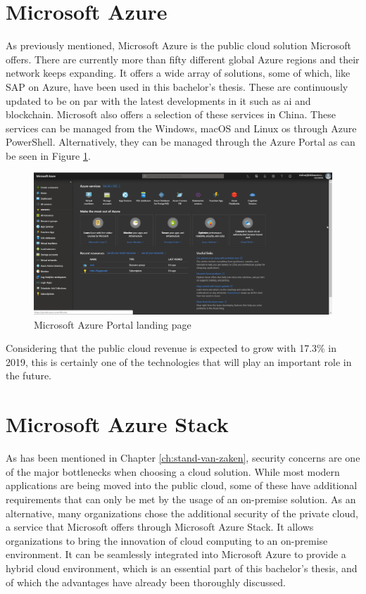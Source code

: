 \section{Microsoft Azure}
As previously mentioned, Microsoft Azure is the public cloud solution Microsoft offers. 
There are currently more than fifty different global Azure regions and their network keeps expanding. 
It offers a wide array of solutions, some of which, like SAP on Azure, have been used in this bachelor's thesis. 
These are continuously updated to be on par with the latest developments in \acrshort{it} such as \acrfull{ai} and blockchain. 
Microsoft also offers a selection of these services in China. 
These services can be managed from the Windows, macOS  and Linux \acrshort{os} through Azure PowerShell. 
Alternatively, they can be managed through the Azure Portal as can be seen in Figure \ref{fig:Azure_Portal}.

\begin{figure}[h]
	\captionsetup{width=0.8\linewidth}
	\includegraphics[width=0.9\linewidth]{img/Toekomstvisie/Azure0.png}
	\centering
	\caption[Azure Portal]{Microsoft Azure Portal landing page}
	\label{fig:Azure_Portal}
\end{figure}
Considering that the public cloud revenue is expected to grow with 17.3\% in 2019, this is certainly one of the technologies that will play an important role in the future. \autocite{Ng2018}

\section{Microsoft Azure Stack}
As has been mentioned in Chapter \ref{ch:stand-van-zaken}, security concerns are one of the major bottlenecks when choosing a cloud solution. 
While most modern applications are being moved into the public cloud, some of these have additional requirements that can only be met by the usage of an on-premise solution. 
As an alternative, many organizations chose the additional security of the private cloud, a service that Microsoft offers through Microsoft Azure Stack. 
It allows organizations to bring the innovation of cloud computing to an on-premise environment.
It can be seamlessly integrated into Microsoft Azure to provide a hybrid cloud environment, which is an essential part of this bachelor's thesis, and of which the advantages have already been thoroughly discussed.

